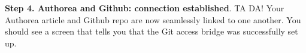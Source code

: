 \textbf{Step 4. Authorea and Github: connection established}. TA DA! Your Authorea article and Github repo are now seamlessly linked to one another. You should see a screen that tells you that the Git access bridge was successfully set up.